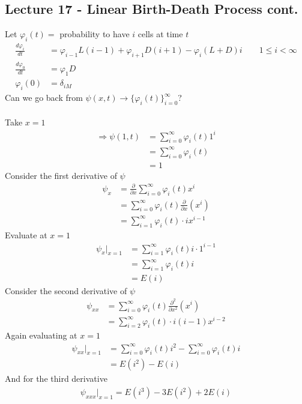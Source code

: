 \documentclass[12pt, letterpaper]{article}
\begin{document}
\subsection{Lecture 17 - Linear Birth-Death Process cont.}
Let $\varphi_i(t) = $ probability to have $i$ cells at time $t$
\begin{align*}
    \frac{d\varphi_i}{dt} &= \varphi_{i-1}L(i-1) + \varphi_{i+1} D(i+1) - \varphi_i(L+D)i \qquad 1 \le i < \infty \\
    \frac{d\varphi_0}{dt} &= \varphi_1D \\
    \varphi_i(0) &= \delta_{iM}
\end{align*}
Can we go back from $\psi(x,t) \rightarrow\{\varphi_i(t)\}^\infty_{i=0}$? \\ \\
Take $x = 1$
\begin{align*}
    \Rightarrow \psi(1,t) &= \sum_{i=0}^{\infty}\varphi_i(t)1^i \\
    &= \sum_{i=0}^{\infty} \varphi_i(t) \\
    &= 1
\end{align*}
Consider the first derivative of $\psi$
\begin{align*}
    \psi_x &= \frac{\partial}{\partial x}\sum_{i=0}^{\infty} \varphi_i(t) x^i \\
    &= \sum_{i=0}^{\infty}\varphi_i(t) \frac{\partial}{\partial x}(x^i) \\
    &= \sum_{i=1}^{\infty}\varphi_i(t)\cdot ix^{i-1}
\end{align*}
Evaluate at $x = 1$
\begin{align*}
    \psi_x\Big|_{x=1} &= \sum_{i=1}^{\infty} \varphi_i(t)i\cdot 1^{i-1} \\
    &= \sum_{i=1}^{\infty}\varphi_i(t)i \\
    &= E(i)
\end{align*}
Consider the second derivative of $\psi$
\begin{align*}
    \psi_{xx} &= \sum_{i=0}^{\infty}\varphi_i(t) \frac{\partial^2}{\partial x^2}(x^i) \\
    &= \sum_{i=2}^{\infty}\varphi_i(t)\cdot  i(i-1)x^{i-2}
\end{align*}
Again evaluating at $x = 1$
\begin{align*}
    \psi_{xx}\Big|_{x=1} &= \sum_{i=0}^{\infty}\varphi_i(t)i^2 - \sum_{i=0}^{\infty}\varphi_i(t)i \\
    &= E(i^2) - E(i)
\end{align*}
And for the third derivative
\begin{align*}
    \psi_{xxx}\Big|_{x=1} = E(i^3) - 3E(i^2) + 2E(i)
\end{align*}
\end{document}
